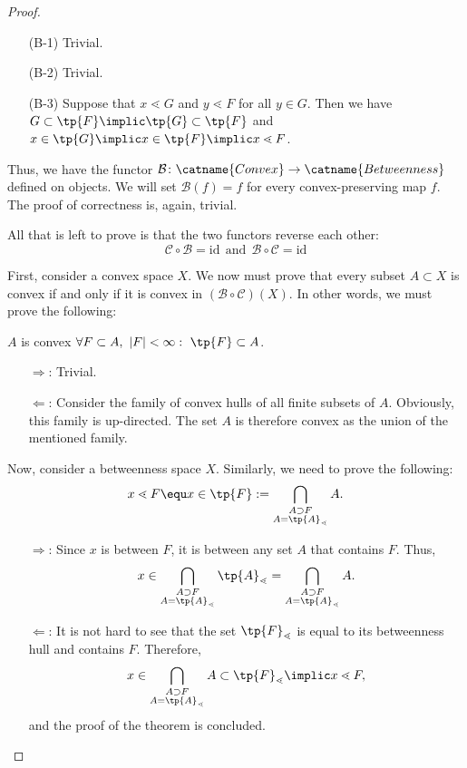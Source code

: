 \documentclass[12pt, a4paper]{article}
\newcommand{\btw}{\lessdot}
\begin{document}
\begin{proof}
\begin{itemize}
    \begin{itemize}
        \item[(B-1)] Trivial.
        \item[(B-2)] Trivial.
        \item[(B-3)] Suppose that \(x \btw G\) and \(y \btw F\) for all \(y \in G\). Then we have \(G \subset \tp{F} \implic \tp{G} \subset \tp{F}\) and \(x \in \tp{G} \implic x \in \tp{F} \implic x \btw F\).
    \end{itemize}

    Thus, we have the functor \(\mathcal{B} \colon \catname{Convex} \to \catname{Betweenness}\) defined on objects. We will set \(\mathcal{B}(f) = f\) for every convex-preserving map \(f\). The proof of correctness is, again, trivial.
\end{itemize}

All that is left to prove is that the two functors reverse each other: \[\mathcal{C} \circ \mathcal{B} = \mathrm{id} \ \ \mbox{and} \ \ \mathcal{B} \circ \mathcal{C} = \mathrm{id}\]

First, consider a convex space \(X\). We now must prove that every subset \(A \subset X\) is convex if and only if it is convex in \((\mathcal{B} \circ \mathcal{C})(X)\). In other words, we must prove the following:

\begin{center}
    \(A\) is convex \Equ \(\forall F \subset A, \ |F| < \infty: \ \tp{F} \subset A\).
\end{center}

\begin{itemize}
    \item[\(\Longrightarrow\):] Trivial.
    \item[\(\Longleftarrow\):] Consider the family of convex hulls of all finite subsets of \(A\). Obviously, this family is up-directed. The set \(A\) is therefore convex as the union of the mentioned family.
\end{itemize}

Now, consider a betweenness space \(X\). Similarly, we need to prove the following: \[x \btw F \equ x \in \tp{F} := \bigcap\limits_{\substack{A \supset F \\ A = \tp{A}_\btw}} A .\]

\begin{itemize}
    \item[\(\Longrightarrow\):] Since \(x\) is between \(F\), it is between any set \(A\) that contains \(F\). Thus, \[x \in \bigcap\limits_{\substack{A \supset F \\ A = \tp{A}_\btw}} \tp{A}_\btw = \bigcap\limits_{\substack{A \supset F \\ A = \tp{A}_\btw}} A.\]
    \item[\(\Longleftarrow\):] It is not hard to see that the set \(\tp{F}_\btw\) is equal to its betweenness hull and contains \(F\). Therefore, \[x \in \bigcap\limits_{\substack{A \supset F \\ A = \tp{A}_\btw}} A \subset \tp{F}_\btw \implic x \btw F,\] and the proof of the theorem is concluded.
\end{itemize}
\end{proof}
\end{document}
